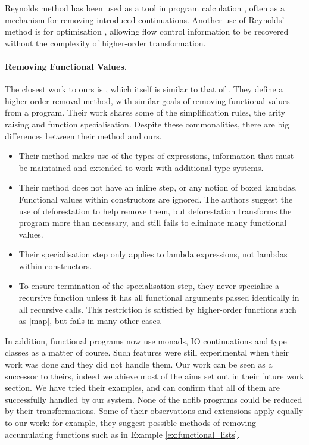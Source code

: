 \documentclass[preprint]{sigplanconf}
\begin{document}
Reynolds method has been used as a tool in program calculation \cite{danvy:defunctionalization_at_work,hutton:calculating_an_exceptional_machine}, often as a mechanism for removing introduced continuations. Another use of Reynolds' method is for optimisation \cite{grin,jhc}, allowing flow control information to be recovered without the complexity of higher-order transformation.

\paragraph{Removing Functional Values.} The closest work to ours is \citet{chin:higher_order_removal}, which itself is similar to that of \citet{nelan:firstification}. They define a higher-order removal method, with similar goals of removing functional values from a program. Their work shares some of the simplification rules, the arity raising and function specialisation. Despite these commonalities, there are big differences between their method and ours.

\begin{itemize}
\item Their method makes use of the types of expressions, information that must be maintained and extended to work with additional type systems.
\item Their method does not have an inline step, or any notion of boxed lambdas. Functional values within constructors are ignored. The authors suggest the use of deforestation \cite{wadler:deforestation} to help remove them, but deforestation transforms the program more than necessary, and still fails to eliminate many functional values.
\item Their specialisation step only applies to lambda expressions, not lambdas within constructors.
\item To ensure termination of the specialisation step, they never specialise a recursive function unless it has all functional arguments passed identically in all recursive calls. This restriction is satisfied by higher-order functions such as |map|, but fails in many other cases.
\end{itemize}

In addition, functional programs now use monads, IO continuations and type classes as a matter of course. Such features were still experimental when their work was done and they did not handle them. Our work can be seen as a successor to theirs, indeed we ahieve most of the aims set out in their future work section. We have tried their examples, and can confirm that all of them are successfully handled by our system. None of the nofib programs could be reduced by their transformations. Some of their observations and extensions apply equally to our work: for example, they suggest possible methods of removing accumulating functions such as in Example \ref{ex:functional_lists}.
\end{document}
